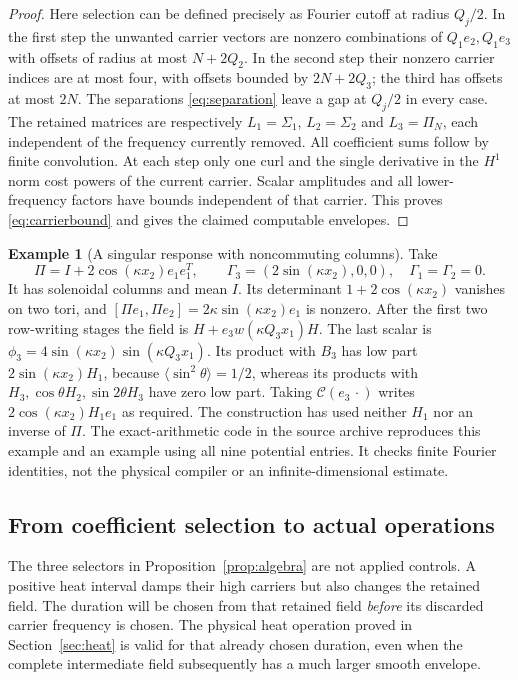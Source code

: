 \documentclass[11pt,a4paper]{amsart}
\theoremstyle{definition}
\newtheorem{example}[theorem]{Example}
\theoremstyle{remark}
\numberwithin{equation}{section}
\begin{document}
\begin{proof}
Here selection can be defined precisely as Fourier cutoff at radius $Q_j/2$.
In the first step the unwanted carrier vectors are nonzero combinations
of $Q_1e_2,Q_1e_3$ with offsets of radius at most $N+2Q_2$.
In the second step their nonzero carrier indices are at most four, with
offsets bounded by $2N+2Q_3$; the third has offsets at most $2N$.
The separations \eqref{eq:separation} leave a gap at $Q_j/2$ in every case.
The retained matrices are respectively $L_1=\Sigma_1$, $L_2=\Sigma_2$ and
$L_3=\Pi_N$, each independent of the frequency currently removed.
All coefficient sums follow by finite convolution. At each step only one
curl and the single derivative in the $H^1$ norm cost powers of the current
carrier. Scalar amplitudes and all lower-frequency factors have bounds
independent of that carrier. This proves \eqref{eq:carrierbound} and gives
the claimed computable envelopes.
\end{proof}

\begin{example}[A singular response with noncommuting columns]\label{ex:singular}
Take
\[
 \Pi=I+2\cos(\kappa x_2)e_1e_1^T,
 \qquad \Gamma_3=(2\sin(\kappa x_2),0,0),\quad\Gamma_1=\Gamma_2=0.
\]
It has solenoidal columns and mean $I$. Its determinant
$1+2\cos(\kappa x_2)$ vanishes on two tori, and
$[\Pi e_1,\Pi e_2]=2\kappa\sin(\kappa x_2)e_1$ is nonzero.
After the first two row-writing stages the field is
$H+e_3w(\kappa Q_3x_1)H$.
The last scalar is $\phi_3=4\sin(\kappa x_2)\sin(\kappa Q_3x_1)$.
Its product with $B_3$ has low part $2\sin(\kappa x_2)H_1$,
because $\langle\sin^2\theta\rangle=1/2$, whereas its products with
$H_3,\cos\theta H_2,\sin2\theta H_3$ have zero low part.
Taking $\mathscr C(e_3\,\cdot)$ writes
$2\cos(\kappa x_2)H_1e_1$ as required.
The construction has used neither $H_1$ nor an inverse of $\Pi$.
The exact-arithmetic code in the source archive reproduces this example
and an example using all nine potential entries. It checks finite Fourier
identities, not the physical compiler or an infinite-dimensional estimate.
\end{example}

\subsection{From coefficient selection to actual operations}
The three selectors in Proposition~\ref{prop:algebra} are not applied
controls. A positive heat interval damps their high carriers but also
changes the retained field. The duration will be chosen from that retained
field \emph{before} its discarded carrier frequency is chosen.
The physical heat operation proved in Section~\ref{sec:heat} is valid for
that already chosen duration, even when the complete intermediate field
subsequently has a much larger smooth envelope.
\end{document}

